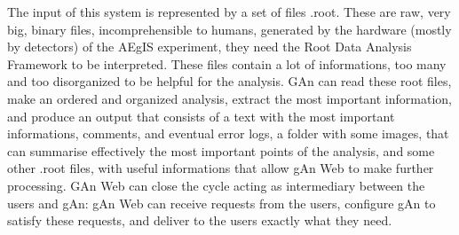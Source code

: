 The input of this system is represented by a set of files .root. These are raw, very big, binary files, incomprehensible to humans, generated by the hardware (mostly by detectors) of the AEgIS experiment, they need the Root Data Analysis Framework to be interpreted. These files contain a lot of informations, too many and too disorganized to be helpful for the analysis. GAn can read these root files, make an ordered and organized analysis, extract the most important information, and produce an output that consists of a text with the most important informations, comments, and eventual error logs, a folder with some images, that can summarise effectively the most important points of the analysis, and some other .root files, with useful informations that allow gAn Web to make further processing. GAn Web can close the cycle acting as intermediary between the users and gAn: gAn Web can receive requests from the users, configure gAn to satisfy these requests, and deliver to the users exactly what they need.


